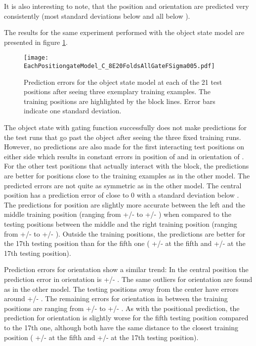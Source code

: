 It is also interesting to note, that the position and orientation are predicted very consistently (most standard deviations below  and all below ).

The results for the same experiment performed with the object state model are presented in figure \ref{fig:eachPosGate}.

\begin{figure}
\centering
\texttt{[image: EachPositiongateModel\_C\_8E20FoldsAllGateFSigma005.pdf]}
\caption{Prediction errors for the object state model at each of the 21 test positions after seeing three exemplary training examples. The training positions are highlighted by the block lines. Error bars indicate one standard deviation.}
\label{fig:eachPosGate}
\end{figure}

The object state with gating function successfully does not make predictions for the test runs that go past the object after seeing the three fixed training runs. However, no predictions are also made for the first interacting test positions on either side which results in constant errors in position of  and in orientation of .
For the other test positions that actually interact with the block, the predictions are better for positions close to the training examples as in the other model.
The predicted errors are not quite as symmetric as in the other model.
The central position has a prediction error of close to 0 with a standard deviation below . 
The predictions for position are slightly more accurate between the left and the middle training position (ranging from  +/-  to  +/- ) when compared to the testing positions between the middle and the right training position (ranging from  +/-  to  +/- ). Outside the training positions, the predictions are better for the 17th testing position than for the fifth one ( +/-  at the fifth and  +/-  at the 17th testing position).

Prediction errors for orientation show a similar trend: 
In the central position the prediction error in orientation is  +/- .
The same outliers for orientation are found as in the other model. The testing positions  away from the center have errors around  +/- .
The remaining errors for orientation in between the training positions are ranging from  +/-  to  +/- .
As with the positional prediction, the prediction for orientation is slightly worse for the fifth testing position compared to the 17th one, although both have the same distance to the closest training position ( +/-  at the fifth and  +/-  at the 17th testing position).

